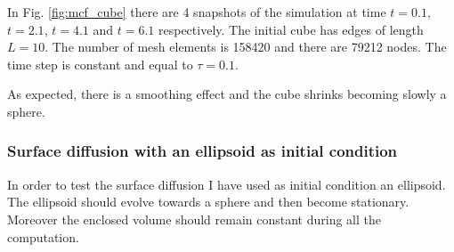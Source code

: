 \documentclass[a4paper,11pt, onecolumn]{article}
\begin{document}
In Fig. \ref{fig:mcf_cube} there are 4 snapshots of the simulation at time
$t=0.1$, $t=2.1$, $t=4.1$ and $t=6.1$ respectively. The initial cube  has edges
of length $L=10$. The number of mesh elements is 158420 and there are 79212
nodes. The time step is constant and equal to $\tau=0.1$.
\newline

As expected, there is a smoothing effect and the cube shrinks becoming slowly a
sphere.

\subsubsection{Surface diffusion with an ellipsoid as initial condition}

In order to test the surface diffusion I have used as initial condition an
ellipsoid. The ellipsoid should evolve towards a sphere and then become
stationary. Moreover the enclosed volume should remain constant during all the
computation.
\end{document}

